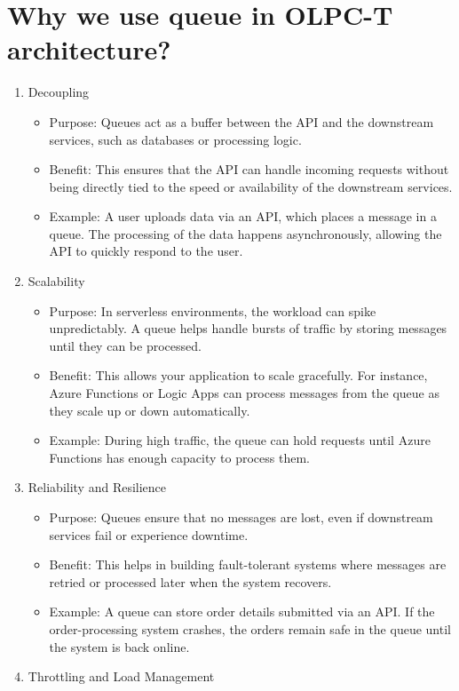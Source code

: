 \documentclass[a4paper,11pt]{article}
\begin{document}
\section{Why we use queue in OLPC-T architecture?}
\begin{enumerate}
	\item Decoupling
	\begin{itemize}
		\item Purpose: Queues act as a buffer between the API and the downstream services, such as databases or processing logic.
		\item Benefit: This ensures that the API can handle incoming requests without being directly tied to the speed or availability of the downstream services.
		\item Example: A user uploads data via an API, which places a message in a queue. The processing of the data happens asynchronously, allowing the API to quickly respond to the user.
	\end{itemize}
	\item Scalability
	\begin{itemize}
		\item Purpose: In serverless environments, the workload can spike unpredictably. A queue helps handle bursts of traffic by storing messages until they can be processed.
		\item Benefit: This allows your application to scale gracefully. For instance, Azure Functions or Logic Apps can process messages from the queue as they scale up or down automatically.
		\item Example: During high traffic, the queue can hold requests until Azure Functions has enough capacity to process them.
	\end{itemize}
	\item Reliability and Resilience
	\begin{itemize}
		\item Purpose: Queues ensure that no messages are lost, even if downstream services fail or experience downtime.
		\item Benefit: This helps in building fault-tolerant systems where messages are retried or processed later when the system recovers.
		\item Example: A queue can store order details submitted via an API. If the order-processing system crashes, the orders remain safe in the queue until the system is back online.
	\end{itemize}
	\item Throttling and Load Management

\end{enumerate}
\end{document}
